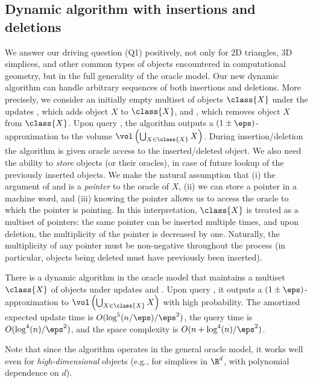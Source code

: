\subsection{Dynamic algorithm with insertions and deletions}
We answer our driving question (Q1) positively, not only for 2D triangles, 3D simplices, and other common types of objects encountered in computational geometry, but in the full generality of the oracle model.  Our new dynamic algorithm can handle arbitrary sequences of both insertions and deletions.
%
More precisely, we consider an initially empty multiset of objects $\class{X}$ under the updates , which adds object $X$ to $\class{X}$, and , which removes object $X$ from $\class{X}$. Upon query \est{}, the algorithm outputs a $(1\pm\eps)$-approximation to the volume $\vol\left(\bigcup_{X \in \class{X}} X\right)$.
%
During insertion/deletion the algorithm is given oracle access to the inserted/deleted object. We also need the ability to \emph{store} objects (or their oracles), in case of future lookup of the previously inserted objects. We make the natural assumption that (i) the argument of  and  is a \emph{pointer} to the oracle of $X$, (ii) we can store a pointer in a machine word, and (iii) knowing the pointer allows us to access the oracle to which the pointer is pointing. In this interpretation, $\class{X}$ is treated as a multiset of pointers: the same pointer can be inserted multiple times, and upon deletion, the multiplicity of the pointer is decreased by one. Naturally, the multiplicity of any pointer must be non-negative throughout the process (in particular, objects being deleted must have previously been inserted).
%
\begin{theorem}
\label{thm:dynamicalgo}%
There is a dynamic algorithm in the oracle model that maintains a multiset $\class{X}$ of objects under updates  and . Upon query \est{}, it outputs a $(1\pm\eps)$-approximation to $\vol\left(\bigcup_{X \in \class{X}} X\right)$ with high probability. The amortized expected update time is $O(\log^5(n/\eps)/\eps^2)$, the query time is $O(\log^4(n)/\eps^2)$, and the space complexity is $O(n + \log^4(n)/\eps^2)$.
\end{theorem}
%
Note that since the algorithm operates in the general oracle model, it works well even for \emph{high-dimensional} objects (e.g., for simplices in $\R^d$, with polynomial dependence on $d$).
%
%
